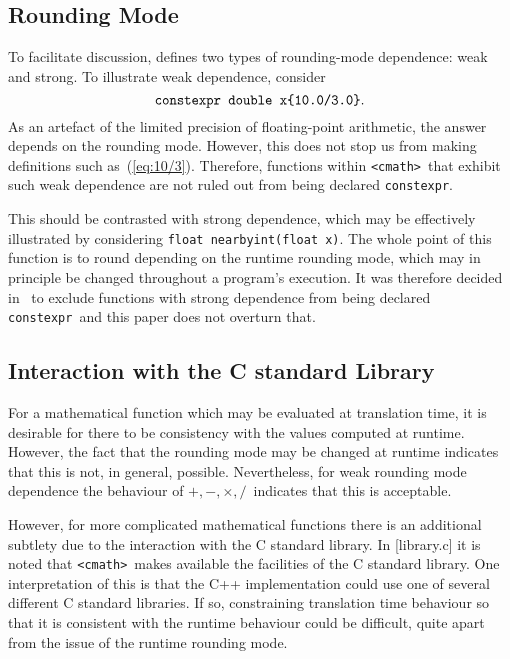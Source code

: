 \documentclass[prd,twocolumn,amsmath,amssymb,nofootinbib,eqsecnum]{revtex4-1}
\newcommand{\constexpr}{\code{constexpr}\xspace}
\newcommand{\code}[1]{{\tt #1}}
\newcommand{\header}[1]{{\tt <#1>}}
\newcommand{\cmath}{\header{cmath}}
\newcommand{\Operators}{\ensuremath{+,-,\times,/}}
\newcommand{\eq}[1]{(\ref{eq:#1})}
\begin{document}
\subsection{Rounding Mode}
\label{sec:rounding}

To facilitate discussion, \cite{Rosten-constexpr} defines two types of rounding-mode dependence: weak and strong. To illustrate weak dependence, consider
\begin{equation}
	\mbox{\code{constexpr double x\{10.0/3.0\}}}.
\label{eq:10/3}
\end{equation}
As an artefact of the limited precision of floating-point arithmetic, the answer depends on the rounding mode. However, this does not stop us from making definitions such as~\eq{10/3}. Therefore, functions  within \cmath\ that exhibit such weak dependence are not ruled out from being declared \constexpr.

This should be contrasted with strong dependence, which may be effectively illustrated by considering \code{float nearbyint(float x)}. The whole point of this function is to round depending on the runtime rounding mode, which may in principle be changed throughout a program's execution. It was therefore decided in~\cite{Rosten-constexpr} to exclude functions with strong dependence from being declared \constexpr\ and this paper does not overturn that.

\subsection{Interaction with the C standard Library}

For a mathematical function which may be evaluated at translation time, it is desirable for there to be
consistency with the values computed at runtime. However, the fact that the rounding mode
may be changed at runtime indicates that this is not, in general, possible. Nevertheless, for
weak rounding mode dependence the behaviour of \Operators\ indicates that this is acceptable.

 However, for more complicated mathematical functions there is an additional subtlety due
to the interaction with the C standard library. In [library.c] it is noted that \cmath\ makes available the facilities of the C standard library. One interpretation of this is that the C++
implementation could use one of several different C standard libraries. If so, 
constraining translation time behaviour so that it is consistent with the runtime behaviour
could be difficult, quite apart from the issue of the runtime rounding mode.
\end{document}
